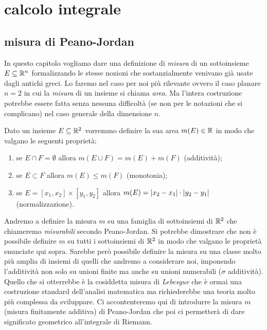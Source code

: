\chapter{calcolo integrale}

\section{misura di Peano-Jordan}

In questo capitolo vogliamo dare una definizione di \emph{misura} di un
sottoinsieme $E\subseteq {\mathbb R}^n$ formalizzando le stesse nozioni che sostanzialmente
venivano già usate dagli antichi greci.
Lo faremo nel caso per noi più rilevante ovvero il caso planare $n=2$ in cui la \emph{misura}
di un insieme si chiama \emph{area}.
Ma l'intera costruzione potrebbe essere fatta senza
nessuna difficoltà (se non per le notazioni che si complicano) nel caso generale della
dimensione $n$.

Dato un insieme $E\subseteq {\mathbb R}^2$ vorremmo definire la sua area $m(E)\in {\mathbb R}$
in modo che valgano le seguenti proprietà:
\begin{enumerate}
  \item se $E\cap F=\emptyset$ allora $m(E\cup F) = m(E) + m(F)$ (additività);
  \item se $E \subset F$ allora $m(E) \le m(F)$ (monotonia);
  \item se $E=[x_1,x_2]\times [y_1,y_2]$
  allora $m(E) = {\left|x_2-x_1\right|}\cdot {\left|y_2-y_1\right|}$ (normalizzazione).
\end{enumerate}

Andremo a definire la misura $m$ su una famiglia di sottoinsiemi di ${\mathbb R}^2$ che
chiameremo \emph{misurabili} secondo Peano-Jordan.
Si potrebbe dimostrare che non è possibile definire $m$ su tutti i sottoinsiemi di ${\mathbb R}^2$
in modo che valgano le proprietà enunciate qui sopra.
Sarebbe però possibile
definire la misura su una classe molto più amplia di insiemi di quelli che andremo a considerare noi, 
imponendo l'additività non solo su unioni finite ma anche su unioni numerabili
($\sigma$ additività).
Quello che si otterrebbe
è la cosiddetta misura di \emph{Lebesgue} che è ormai una costruzione standard
dell'analisi matematica ma richiederebbe una teoria molto più complessa da sviluppare.
Ci accontenteremo qui di introdurre la misura $m$ (misura finitamente additiva) 
di Peano-Jordan
che poi ci permetterà di dare significato geometrico all'integrale di Riemann.
%
%
%


